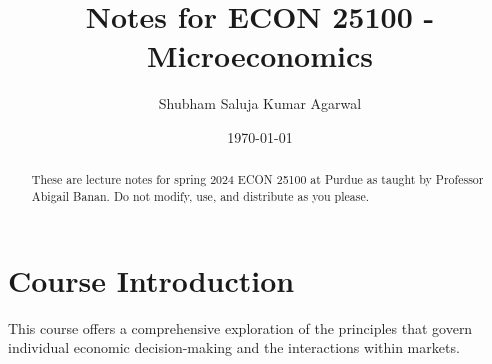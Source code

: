 \documentclass[nobib]{tufte-handout}
\title{Notes for ECON 25100 - Microeconomics}
\author[Shubham Saluja Kumar Agarwal]{Shubham Saluja Kumar Agarwal}
\date{\today}  %
\begin{document}
\maketitle

\begin{abstract}
    These are lecture notes for spring 2024 ECON 25100 at Purdue as taught by Professor Abigail Banan. Do not modify, use, and distribute as you please.
\end{abstract}

\tableofcontents

\section{Course Introduction}
This course offers a comprehensive exploration of the principles that govern
individual economic decision-making and the interactions within markets.

\pagebreak
\end{document}
